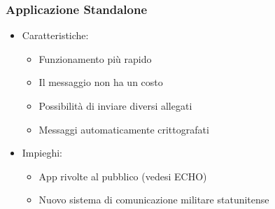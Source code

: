 \begin{frame}
 \frametitle{Applicazione Standalone}
 
 \begin{itemize}
  \item<1-> Caratteristiche:
  \begin{itemize}
   \item Funzionamento più rapido
   \item Il messaggio non ha un costo
   \item Possibilità di inviare diversi allegati
   \item Messaggi automaticamente crittografati
  \end{itemize}
   \item<2-> Impieghi:
  \begin{itemize}
   \item App rivolte al pubblico (vedesi ECHO)
   \item Nuovo sistema di comunicazione militare statunitense
  \end{itemize}
 \end{itemize}


\end{frame}
